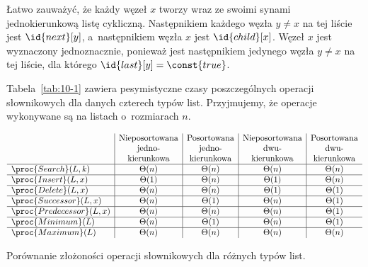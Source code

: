Łatwo zauważyć, że każdy węzeł $x$ tworzy wraz ze swoimi synami jednokierunkową listę cykliczną. Następnikiem każdego węzła $y\ne x$ na tej liście jest $\id{next}[y]$, a~następnikiem węzła $x$ jest $\id{child}[x]$. Węzeł $x$ jest wyznaczony jednoznacznie, ponieważ jest następnikiem jedynego węzła $y\ne x$ na tej liście, dla którego $\id{last}[y]=\const{true}$.

\problems

Tabela~\ref{tab:10-1} zawiera pesymistyczne czasy poszczególnych operacji słownikowych dla danych czterech typów list. Przyjmujemy, że operacje wykonywane są na listach o~rozmiarach $n$.

\begin{table}[ht]
	\begin{center}
		\[
			\begin{array}{l|c|c|c|c}
				& \text{Nieposortowana} & \text{Posortowana} & \text{Nieposortowana} & \text{Posortowana} \\
				& \text{jedno-} & \text{jedno-} & \text{dwu-} & \text{dwu-} \\
				& \text{kierunkowa} & \text{kierunkowa} & \text{kierunkowa} & \text{kierunkowa} \\
				\hline
				\proc{Search}(L,k) & \Theta(n) & \Theta(n) & \Theta(n) & \Theta(n) \\
				\hline
				\proc{Insert}(L,x) & \Theta(1) & \Theta(n) & \Theta(1) & \Theta(n) \\
				\hline
				\proc{Delete}(L,x) & \Theta(n) & \Theta(n) & \Theta(1) & \Theta(1) \\
				\hline
				\proc{Successor}(L,x) & \Theta(n) & \Theta(1) & \Theta(n) & \Theta(1) \\
				\hline
				\proc{Predecessor}(L,x) & \Theta(n) & \Theta(n) & \Theta(n) & \Theta(1) \\
				\hline
				\proc{Minimum}(L) & \Theta(n) & \Theta(1) & \Theta(n) & \Theta(1) \\
				\hline
				\proc{Maximum}(L) & \Theta(n) & \Theta(n) & \Theta(n) & \Theta(n)
			\end{array}
		\]
	\end{center}
	\caption{Porównanie złożoności operacji słownikowych dla różnych typów list.} \label{tab:10-1}
\end{table}


\subproblem %
\subproblem %
\subproblem %


\subproblem %
\subproblem %
\subproblem %
\subproblem %
\subproblem %
\subproblem %
\subproblem %
\subproblem %

\endinput
